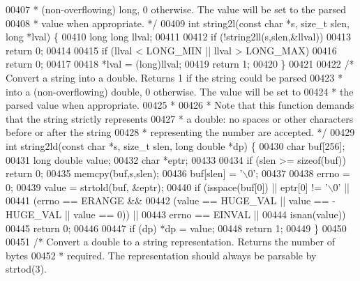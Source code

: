 \begin{DoxyCode}
00407 \textcolor{comment}{ * (non-overflowing) long, 0 otherwise. The value will be set to the parsed}
00408 \textcolor{comment}{ * value when appropriate. */}
00409 \textcolor{keywordtype}{int} string2l(\textcolor{keyword}{const} \textcolor{keywordtype}{char} *s, size\_t slen, \textcolor{keywordtype}{long} *lval) \{
00410     \textcolor{keywordtype}{long} \textcolor{keywordtype}{long} llval;
00411 
00412     \textcolor{keywordflow}{if} (!string2ll(s,slen,&llval))
00413         \textcolor{keywordflow}{return} 0;
00414 
00415     \textcolor{keywordflow}{if} (llval < LONG\_MIN || llval > LONG\_MAX)
00416         \textcolor{keywordflow}{return} 0;
00417 
00418     *lval = (\textcolor{keywordtype}{long})llval;
00419     \textcolor{keywordflow}{return} 1;
00420 \}
00421 
00422 \textcolor{comment}{/* Convert a string into a double. Returns 1 if the string could be parsed}
00423 \textcolor{comment}{ * into a (non-overflowing) double, 0 otherwise. The value will be set to}
00424 \textcolor{comment}{ * the parsed value when appropriate.}
00425 \textcolor{comment}{ *}
00426 \textcolor{comment}{ * Note that this function demands that the string strictly represents}
00427 \textcolor{comment}{ * a double: no spaces or other characters before or after the string}
00428 \textcolor{comment}{ * representing the number are accepted. */}
00429 \textcolor{keywordtype}{int} string2ld(\textcolor{keyword}{const} \textcolor{keywordtype}{char} *s, size\_t slen, \textcolor{keywordtype}{long} \textcolor{keywordtype}{double} *dp) \{
00430     \textcolor{keywordtype}{char} buf[256];
00431     \textcolor{keywordtype}{long} \textcolor{keywordtype}{double} value;
00432     \textcolor{keywordtype}{char} *eptr;
00433 
00434     \textcolor{keywordflow}{if} (slen >= \textcolor{keyword}{sizeof}(buf)) \textcolor{keywordflow}{return} 0;
00435     memcpy(buf,s,slen);
00436     buf[slen] = \textcolor{stringliteral}{'\(\backslash\)0'};
00437 
00438     errno = 0;
00439     value = strtold(buf, &eptr);
00440     \textcolor{keywordflow}{if} (isspace(buf[0]) || eptr[0] != \textcolor{stringliteral}{'\(\backslash\)0'} ||
00441         (errno == ERANGE &&
00442             (value == HUGE\_VAL || value == -HUGE\_VAL || value == 0)) ||
00443         errno == EINVAL ||
00444         isnan(value))
00445         \textcolor{keywordflow}{return} 0;
00446 
00447     \textcolor{keywordflow}{if} (dp) *dp = value;
00448     \textcolor{keywordflow}{return} 1;
00449 \}
00450 
00451 \textcolor{comment}{/* Convert a double to a string representation. Returns the number of bytes}
00452 \textcolor{comment}{ * required. The representation should always be parsable by strtod(3).}

\end{DoxyCode}
